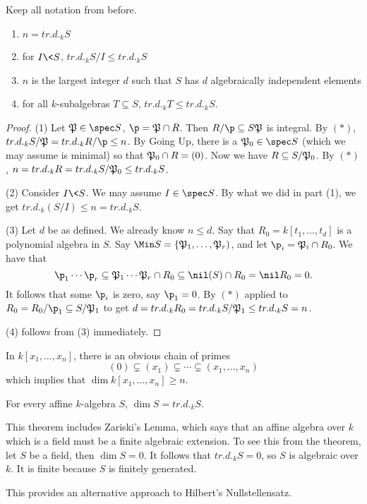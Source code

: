  \begin{theorem}
   Keep all notation from before.
   \begin{enumerate}
     \item $n=tr.d._k S$
     \item for $I\< S$, $tr.d._k S/I\le tr.d._k S$
     \item $n$ is the largest integer $d$ such that $S$ has $d$ algebraically independent elements
     \item for all $k$-subalgebras $T\subseteq S$, $tr.d._k T\le tr.d._k S$.
   \end{enumerate}
 \end{theorem}
 \begin{proof}
   (1) Let $\P\in \spec S$, $\p=\P\cap R$. Then $R/\p\subseteq S\P$ is integral. By
   $(\ast)$, $tr.d._k S/\P = tr.d._k R/\p\le n$. By Going Up, there is a $\P_0\in \spec
   S$ (which we may assume is minimal) so that $\P_0\cap R=(0)$. Now we have $R\subseteq
   S/\P_0$. By $(\ast)$, $n=tr.d._k R= tr.d._k S/\P_0\le tr.d._k S$.

   (2) Consider $I\< S$. We may assume $I\in \spec S$. By what we did in part (1), we get
   $tr.d._k (S/I)\le n=tr.d._k S$.

   (3) Let $d$ be as defined. We already know $n\le d$. Say that $R_0=k[t_1,\dots, t_d]$
   is a polynomial algebra in $S$. Say $\Min S=\{\P_1,\dots, \P_r)$, and let $\p_i =
   \P_i\cap R_0$. We have that
   \[
   \p_1\cdots \p_r \subseteq \P_1\cdots \P_r \cap R_0 \subseteq \nil (S)\cap R_0 = \nil R_0 =
   0.
   \]
   It follows that some $\p_i$ is zero, say $\p_1=0$. By $(\ast)$ applied to
   $R_0=R_0/\p_1\subseteq S/\P_1$ to get $d=tr.d._k R_0 = tr.d._k S/\P_1 \le tr.d._k
   S=n$.

   (4) follows from (3) immediately.
 \end{proof}
 In $k[x_1,\dots, x_n]$, there is an obvious chain of primes
 \[
  (0)\subsetneq (x_1)\subsetneq \cdots \subsetneq (x_1,\dots, x_n)
 \]
 which implies that $\dim k[x_1,\dots, x_n]\ge n$.
 \begin{theorem} \label{lec41T:dim=trd}
   For every affine $k$-algebra $S$, $\dim S=tr.d._k S$.
 \end{theorem}
 \begin{remark}
   This theorem includes Zariski's Lemma, which says that an affine algebra over $k$
   which is a field must be a finite algebraic extension. To see this from the theorem,
   let $S$ be a field, then $\dim S=0$. It follows that $tr.d._k S=0$, so $S$ is
   algebraic over $k$. It is finite because $S$ is finitely generated.

   This provides an alternative approach to Hilbert's Nullstellensatz.
 \end{remark}
